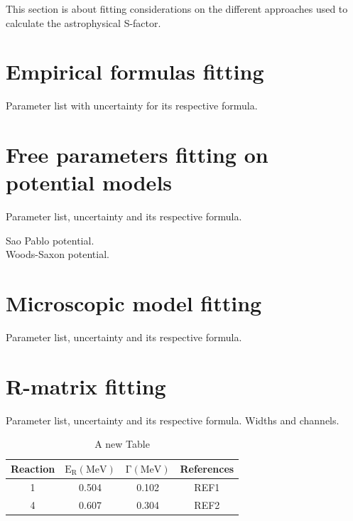 \documentclass[openany]{book}
\begin{document}
This section is about fitting considerations on the different approaches used to calculate the astrophysical S-factor.

\section{Empirical formulas fitting} \label{sec:empiricalFitting}

Parameter list with uncertainty for its respective formula. 

\section{Free parameters fitting on potential models} \label{sec:potentialFitting}

Parameter list, uncertainty and its respective formula.

\cite{chamon_carlson_gasques_2021} Sao Pablo potential. \\

\cite{diaz-torres_2018} Woods-Saxon potential.

\section{Microscopic model fitting} \label{sec:microscopicFitting}

Parameter list, uncertainty and its respective formula.

\cite{gontchar_chushnyakova_2016}

\section{R-matrix fitting} \label{sec:rmatrixFitting}

Parameter list, uncertainty and its respective formula. Widths and channels.


\begin{table}[H]
	\centering
	\begin{tabular}{|c|c|c|c|}
		\hline
		Reaction & $\mathrm{E_R(MeV)}$ &  $\mathrm{\Gamma(MeV)}$ & References  \\  \hline
		1 &  0.504 & 0.102  & REF1  \\
 		4 &  0.607 & 0.304 & REF2 \\
 		\hline
	\end{tabular}
	\caption[R-matrix table]{A new Table}
	\label{table:fitting_rmatrix}
\end{table}
\end{document}
